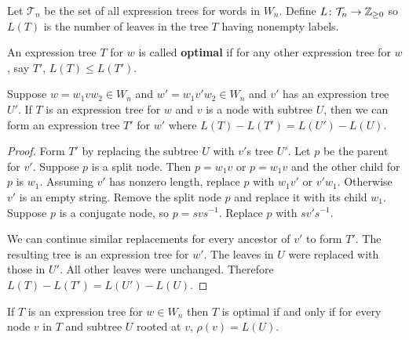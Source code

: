 \documentclass[12pt]{thesis}
\begin{document}
Let $\mathcal{T}_{n}$ be the set
of all expression trees for words in $W_{n}$.
Define $L \colon \mathcal{T}_{n} \rightarrow \mathbb{Z}_{\geq 0}$ 
so $L(T)$ is the number
of leaves in the tree $T$ having nonempty labels.
\begin{definition}
    An expression tree $T$ for $w$
    is called \textbf{optimal}
    if
    for any other expression tree for $w$, say $T'$,
    $L(T) \leq L(T')$.
\end{definition}

\begin{proposition}
    \label{prop:replace-node}
    Suppose $w = w_{1} v w_{2} \in W_{n}$
    and $w' = w_{1} v' w_{2} \in W_{n}$
    and $v'$ has an expression tree $U'$.
    If $T$ is an expression tree
    for $w$ and $v$ is a node with subtree $U$,
    then we can form an expression tree $T'$
    for $w'$ where $ L(T) - L(T') = L(U') - L(U)$.
\end{proposition}

\begin{proof}
    Form $T'$ by replacing the subtree $U$ with $v'$s tree $U'$. 
    Let $p$ be the parent for $v'$.
    Suppose $p$ is a split node.
    Then $p = w_{1} v$ or $p = w_{1} v$
    and the other child for $p$ is $w_{1}$.
    Assuming $v'$ has nonzero length, replace $p$ with $w_{1} v'$ or $v' w_{1}$.
    Otherwise $v'$ is an empty string.
    Remove the split node $p$
    and replace it with its child $w_{1}$.
    Suppose $p$ is a conjugate node,
    so $p = svs^{-1}$.
    Replace $p$ with $sv's^{-1}$.

    We can continue similar replacements for every ancestor of $v'$
    to form $T'$.
    The resulting tree is an expression tree for $w'$.
    The leaves in $U$ were replaced with those in $U'$.
    All other leaves were unchanged.
    Therefore $L(T) - L(T')  = L(U') -  L(U)$.
\end{proof}



\begin{proposition}
    If $T$ is an expression tree for $w \in W_{n}$
    then $T$ is optimal if and only
    if for every node $v$
    in $T$ and subtree $U$ rooted at $v$,
    $\rho(v) = L(U)$.
\end{proposition}
\end{document}
